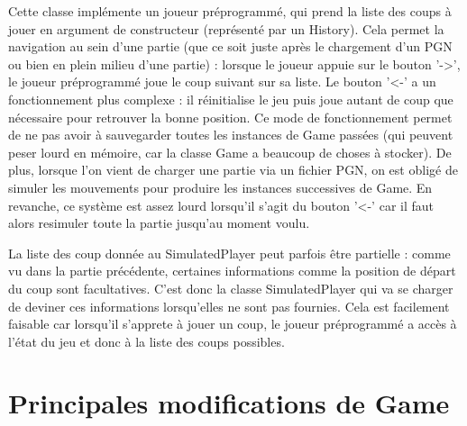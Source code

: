\documentclass[11pt]{article}
\begin{document}
Cette classe implémente un joueur préprogrammé, qui prend la liste des coups à jouer en argument de constructeur (représenté par un History). Cela permet la navigation au sein d'une partie (que ce soit juste après le chargement d'un PGN ou bien en plein milieu d'une partie) : lorsque le joueur appuie sur le bouton '->', le joueur préprogrammé joue le coup suivant sur sa liste. Le bouton '<-' a un fonctionnement plus complexe : il réinitialise le jeu puis joue autant de coup que nécessaire pour retrouver la bonne position. Ce mode de fonctionnement permet de ne pas avoir à sauvegarder toutes les instances de Game passées (qui peuvent peser lourd en mémoire, car la classe Game a beaucoup de choses à stocker). De plus, lorsque l'on vient de charger une partie via un fichier PGN, on est obligé de simuler les mouvements pour produire les instances successives de Game. En revanche, ce système est assez lourd lorsqu'il s'agit du bouton '<-' car il faut alors resimuler toute la partie jusqu'au moment voulu.\newline

La liste des coup donnée au SimulatedPlayer peut parfois être partielle : comme vu dans la partie précédente, certaines informations comme la position de départ du coup sont facultatives. C'est donc la classe SimulatedPlayer qui va se charger de deviner ces informations lorsqu'elles ne sont pas fournies. Cela est facilement faisable car lorsqu'il s'apprete à jouer un coup, le joueur préprogrammé a accès à l'état du jeu et donc à la liste des coups possibles.

\section{Principales modifications de Game}
\end{document}
